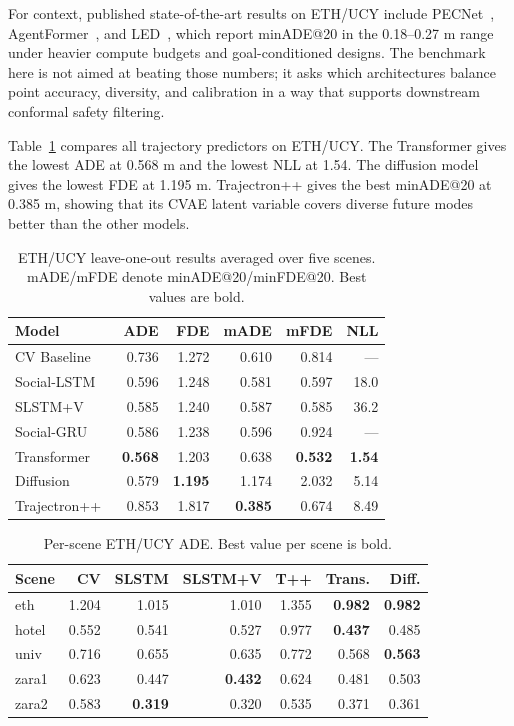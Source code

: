 \documentclass[conference]{IEEEtran}
\begin{document}
For context, published state-of-the-art results on ETH/UCY include
PECNet~\cite{mangalam2020not}, AgentFormer~\cite{yuan2021agentformer}, and
LED~\cite{mao2023leapfrog}, which report minADE@20 in the 0.18--0.27 m range
under heavier compute budgets and goal-conditioned designs. The benchmark
here is not aimed at beating those numbers; it asks which architectures
balance point accuracy, diversity, and calibration in a way that supports
downstream conformal safety filtering.

Table~\ref{tab:ethucy} compares all trajectory predictors on ETH/UCY. The
Transformer gives the lowest ADE at 0.568 m and the lowest NLL at 1.54. The
diffusion model gives the lowest FDE at 1.195 m. Trajectron++ gives the best
minADE@20 at 0.385 m, showing that its CVAE latent variable covers diverse
future modes better than the other models.

\begin{table}[t]
\caption{ETH/UCY leave-one-out results averaged over five scenes.
mADE/mFDE denote minADE@20/minFDE@20. Best values are bold.}
\label{tab:ethucy}
\centering
\footnotesize
\setlength{\tabcolsep}{3.5pt}
\begin{tabular}{@{}lrrrrr@{}}
\toprule
Model & ADE & FDE & mADE & mFDE & NLL \\
\midrule
CV Baseline & 0.736 & 1.272 & 0.610 & 0.814 & --- \\
Social-LSTM~\cite{alahi2016social} & 0.596 & 1.248 & 0.581 & 0.597 & 18.0 \\
SLSTM+V & 0.585 & 1.240 & 0.587 & 0.585 & 36.2 \\
Social-GRU & 0.586 & 1.238 & 0.596 & 0.924 & --- \\
Transformer & \textbf{0.568} & 1.203 & 0.638 & \textbf{0.532} & \textbf{1.54} \\
Diffusion & 0.579 & \textbf{1.195} & 1.174 & 2.032 & 5.14 \\
Trajectron++~\cite{salzmann2020trajectron} & 0.853 & 1.817 & \textbf{0.385} & 0.674 & 8.49 \\
\bottomrule
\end{tabular}
\end{table}

\begin{table}[t]
\caption{Per-scene ETH/UCY ADE. Best value per scene is bold.}
\label{tab:per_scene_ade}
\centering
\scriptsize
\setlength{\tabcolsep}{3pt}
\begin{tabular}{@{}lrrrrrr@{}}
\toprule
Scene & CV & SLSTM & SLSTM+V & T++ & Trans. & Diff. \\
\midrule
eth & 1.204 & 1.015 & 1.010 & 1.355 & \textbf{0.982} & \textbf{0.982} \\
hotel & 0.552 & 0.541 & 0.527 & 0.977 & \textbf{0.437} & 0.485 \\
univ & 0.716 & 0.655 & 0.635 & 0.772 & 0.568 & \textbf{0.563} \\
zara1 & 0.623 & 0.447 & \textbf{0.432} & 0.624 & 0.481 & 0.503 \\
zara2 & 0.583 & \textbf{0.319} & 0.320 & 0.535 & 0.371 & 0.361 \\
\bottomrule
\end{tabular}
\end{table}
\end{document}
